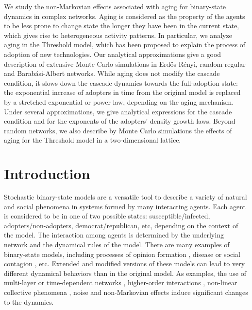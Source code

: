
We study the non-Markovian effects associated with aging for binary-state dynamics in complex networks. Aging is considered as the property of the agents to be less prone to change state the longer they have been in the current state, which gives rise to heterogeneous activity patterns. In particular, we analyze aging in the Threshold model, which has been proposed to  explain the process of adoption of new technologies. Our analytical approximations give a good description of extensive Monte Carlo simulations in Erd\H{o}s-R\'enyi, random-regular and Barab\'asi-Albert networks. While aging does not modify the cascade condition, it slows down the cascade dynamics towards the full-adoption state: the exponential increase of adopters in time from the original model is replaced by a stretched exponential or power law, depending on the aging mechanism. Under several approximations, we give analytical expressions for the cascade condition and for the exponents of the adopters' density growth laws. Beyond random networks, we also describe by Monte Carlo simulations the effects of aging for the Threshold model in a two-dimensional lattice.

\section{\label{sec:Introduction} Introduction}

Stochastic binary-state models are a versatile tool to describe a variety of natural and social phenomena in systems formed by many interacting agents. Each agent is considered to be in one of two possible states: susceptible/infected, adopters/non-adopters, democrat/republican, etc, depending on the context of the model. The interaction among agents is determined by the underlying network and the dynamical rules of the model. There are many examples of binary-state models, including processes of opinion formation \cite{Voter-original,sood-2005,fernandez-gracia-2014,redner-2019}, disease or social contagion \cite{granovetter-1978,pastor-satorras-2015}, etc. Extended and modified versions of these models can lead to very different dynamical behaviors than in the original model. As examples, the use of multi-layer  \cite{diakonova-2014,diakonova-2016,amato-2017} or time-dependent networks \cite{vazquez-2008}, higher-order interactions \cite{de-arruda-2020, iacopini-2019, cencetti-2021}, non-linear collective phenomena \cite{castellano-2009,peralta-2018}, noise \cite{carro-2016} and non-Markovian \cite{van-mieghem-2013,starnini-2017,peralta-2020A,chen-2020} effects induce significant changes to the dynamics.


